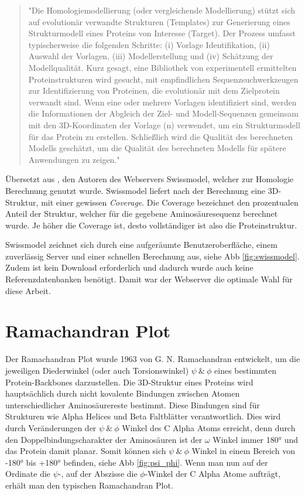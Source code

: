 \begin{quote}
    "Die Homologiemodellierung (oder vergleichende Modellierung) stützt sich auf evolutionär verwandte Strukturen (Templates) zur Generierung eines Strukturmodell eines Proteins von Interesse (Target). Der Prozess umfasst typischerweise die folgenden Schritte: (i) Vorlage Identifikation, (ii) Auswahl der Vorlagen, (iii) Modellerstellung und (iv) Schätzung der Modellqualität. Kurz gesagt, eine Bibliothek von experimentell ermittelten Proteinstrukturen wird gesucht, mit empfindlichen Sequenzsuchwerkzeugen zur Identifizierung von Proteinen, die evolutionär mit dem Zielprotein verwandt sind. Wenn eine oder mehrere Vorlagen identifiziert sind, werden die Informationen der Abgleich der Ziel- und Modell-Sequenzen gemeinsam mit den 3D-Koordinaten der Vorlage (n) verwendet, um ein Strukturmodell für das Protein zu erstellen. Schließlich wird die Qualität des berechneten Modells geschätzt, um die Qualität des berechneten Modells für spätere Anwendungen zu zeigen."
\end{quote}

Übersetzt aus \cite{Biasini.2014}, den Autoren des Webservers Swissmodel, welcher zur Homologie Berechnung genutzt wurde. Swissmodel liefert nach der Berechnung eine 3D-Struktur, mit einer gewissen \emph{Coverage}. Die Coverage bezeichnet den prozentualen Anteil der Struktur, welcher für die gegebene Aminosäuresequenz berechnet wurde. Je höher die Coverage ist, desto vollständiger ist also die Proteinstruktur.

Swissmodel zeichnet sich durch eine aufgeräumte Benutzeroberfläche, einem zuverlässig Server und einer schnellen Berechnung aus, siehe \ac{Abb} \ref{fig:swissmodel}. Zudem ist kein Download erforderlich und dadurch wurde auch keine Referenzdatenbanken benötigt. Damit war der Webserver die optimale Wahl für diese Arbeit.



\section{Ramachandran Plot}
\label{sec:ramachandran}
Der Ramachandran Plot wurde 1963 von G. N. Ramachandran \cite{RAMACHANDRAN.1963} entwickelt, um die jeweiligen Diederwinkel (oder auch Torsionswinkel)  $\psi\ \&\ \phi$ eines bestimmten Protein-Backbones darzustellen. Die 3D-Struktur eines Proteins wird hauptsächlich durch nicht kovalente Bindungen zwischen Atomen unterschiedlicher Aminosäurereste bestimmt. Diese Bindungen sind für Strukturen wie Alpha Helices und Beta Faltblätter verantwortlich. Dies wird durch Veränderungen der  $\psi\ \&\ \phi$ Winkel des C Alpha Atoms erreicht, denn durch den Doppelbindungscharakter der Aminosäuren ist der $\omega$ Winkel immer 180° und das Protein damit planar. Somit können sich $\psi\ \&\ \phi$ Winkel in einem Bereich von -180° bis +180° befinden, siehe \ac{Abb} \ref{fig:psi_phi}. Wenn man nun auf der Ordinate die $\psi$-, auf der Abszisse die $\phi$-Winkel der C Alpha Atome aufträgt, erhält man den typischen Ramachandran Plot. 

